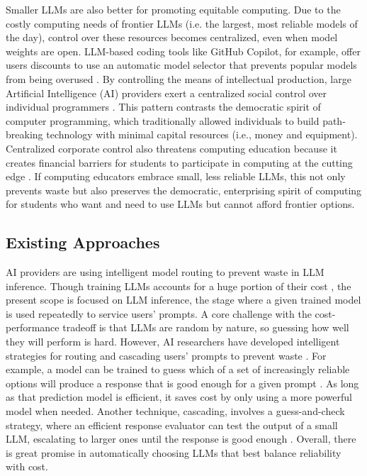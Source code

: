 Smaller LLMs are also better for promoting equitable computing. Due to the costly computing needs of frontier LLMs (i.e. the largest, most reliable models of the day), control over these resources becomes centralized, even when model weights are open. LLM-based coding tools like GitHub Copilot, for example, offer users discounts to use an automatic model selector that prevents popular models from being overused \cite{CopilotAutoModel}. By controlling the means of intellectual production, large Artificial Intelligence (AI) providers exert a centralized social control over individual programmers \cite{sunyaevIdeologyDesignPurposeful2026}. This pattern contrasts the democratic spirit of computer programming, which traditionally allowed individuals to build path-breaking technology with minimal capital resources (i.e., money and equipment). Centralized corporate control also threatens computing education because it creates financial barriers for students to participate in computing at the cutting edge \cite{universityofnewsouthwalesExploringIntersectionDigital2020}. If computing educators embrace small, less reliable LLMs, this not only prevents waste but also preserves the democratic, enterprising spirit of computing for students who want and need to use LLMs but cannot afford frontier options.

\subsection{Existing Approaches}\label{existing-approaches}

AI providers are using intelligent model routing to prevent waste in LLM inference. Though training LLMs accounts for a huge portion of their cost \cite{moslemDynamicModelRouting2026,renReconcilingContrastingNarratives2024}, the present scope is focused on LLM inference, the stage where a given trained model is used repeatedly to service users' prompts. A core challenge with the cost-performance tradeoff is that LLMs are random by nature, so guessing how well they will perform is hard. However, AI researchers have developed intelligent strategies for routing and cascading users' prompts to prevent waste \cite{dingHybridLlmCostefficient2024,CopilotAutoModel,moslemDynamicModelRouting2026,ModelRoutingAI}. For example, a model can be trained to guess which of a set of increasingly reliable options will produce a response that is good enough for a given prompt \cite{dingHybridLlmCostefficient2024}. As long as that prediction model is efficient, it saves cost by only using a more powerful model when needed. Another technique, cascading, involves a guess-and-check strategy, where an efficient response evaluator \cite{zhangBERTScoreEvaluatingText2020} can test the output of a small LLM, escalating to larger ones until the response is good enough \cite{moslemDynamicModelRouting2026}. Overall, there is great promise in automatically choosing LLMs that best balance reliability with cost.


